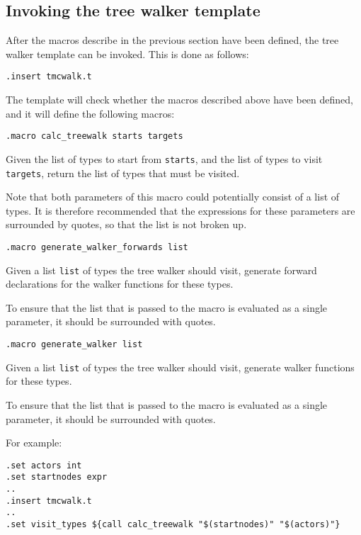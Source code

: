 \subsection{Invoking the tree walker template}
After the macros describe in the previous section have been defined,
the tree walker template can be invoked. This is done as follows:
\begin{verbatim}
.insert tmcwalk.t
\end{verbatim}
The template will check whether the macros described above have been
defined, and it will define the following macros:
\begin{verbatim}
.macro calc_treewalk starts targets
\end{verbatim}
\begin{desc}
Given the list of types to start from \texttt{starts}, and the list of types
to visit \texttt{targets}, return the list of types that must be visited.
\par
Note that both parameters of this macro could potentially consist of
a list of types. It is therefore recommended that the expressions
for these parameters are surrounded by quotes, so that the list is not
broken up.

\end{desc}
\begin{verbatim}
.macro generate_walker_forwards list
\end{verbatim}
\begin{desc}
Given a list \texttt{list} of types the tree walker should visit, generate
forward declarations for the walker functions for these types. 
\par
To ensure that the list that is passed to the macro is evaluated as
a single parameter, it should be surrounded with quotes.
\end{desc}
\begin{verbatim}
.macro generate_walker list
\end{verbatim}
\begin{desc}
Given a list \texttt{list} of types the tree walker should visit, generate
walker functions for these types.
\par
To ensure that the list that is passed to the macro is evaluated as
a single parameter, it should be surrounded with quotes.
\end{desc}
For example:
\begin{verbatim}
.set actors int
.set startnodes expr
..
.insert tmcwalk.t
..
.set visit_types ${call calc_treewalk "$(startnodes)" "$(actors)"}
\end{verbatim}
